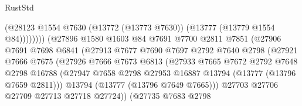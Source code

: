 \begin{lexlean}{RustStd}
\begin{coremodule}
                                        (@28123
                                          @1554
                                          @7630
                                          (@13772 (@13773 @7630))
                                          (@13777 (@13779 @1554 @84))))))))
                              (@27896
                                @1580
                                @1603
                                @84
                                @7691
                                @7700
                                @2811
                                @7851
                                (@27906
                                  @7691
                                  @7698
                                  @6841
                                  (@27913
                                    @7677
                                    @7690
                                    @7697
                                    @2792
                                    @7640
                                    @2798
                                    (@27921
                                      @7666
                                      @7675
                                      (@27926
                                        @7666
                                        @7673
                                        @6813
                                        (@27933
                                          @7665
                                          @7672
                                          @2792
                                          @7648
                                          @2798
                                          @16788
                                          (@27947
                                            @7658
                                            @2798
                                            @27953
                                            @16887
                                            @13794
                                            (@13777 (@13796 @7659 @2811)))
                                          @13794
                                          (@13777 (@13796 @7649 @7665)))
                                        @27703
                                        @27706
                                        @27709
                                        @27713
                                        @27718
                                        @27724))
                                    (@27735
                                      @7683
                                      @2798

\end{coremodule}
\end{lexlean}
